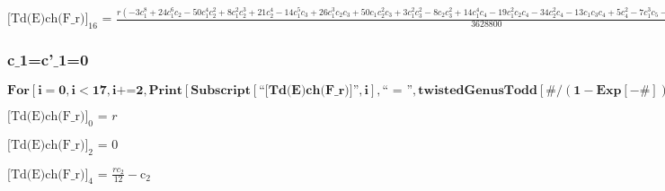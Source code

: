 \documentclass{article}
\newcommand{\unicode}[1]{{}}
\begin{document}
\noindent\(\text{[Td(E)ch(F$\_$r)]}_{16}\text{ = }\frac{r \left(-3 c_1^8+24 c_1^6 c_2-50 c_1^4 c_2^2+8 c_1^2 c_2^3+21 c_2^4-14 c_1^5 c_3+26 c_1^3
c_2 c_3+50 c_1 c_2^2 c_3+3 c_1^2 c_3^2-8 c_2 c_3^2+14 c_1^4 c_4-19 c_1^2 c_2 c_4-34 c_2^2 c_4-13 c_1 c_3 c_4+5 c_4^2-7 c_1^3 c_5-16 c_1 c_2 c_5+3
c_3 c_5+7 c_1^2 c_6+13 c_2 c_6+3 c_1 c_7-3 c_8\right)}{3628800}-\frac{\left(2 c_1^6-12 c_1^4 c_2+11 c_1^2 c_2^2+10 c_2^3+5 c_1^3 c_3+11 c_1 c_2 c_3-c_3^2-5
c_1^2 c_4-9 c_2 c_4-2 c_1 c_5+2 c_6\right) \text{c$\unicode{02bc}$}_2}{60480}+\frac{\left(-c_1^3 c_2+3 c_1 c_2^2+c_1^2 c_3-c_1 c_4\right) \text{c$\unicode{02bc}$}_3}{2880}+\frac{\left(-c_1^4+4
c_1^2 c_2+3 c_2^2+c_1 c_3-c_4\right) \left(2 \text{c$\unicode{02bc}$}_2^2-4 \text{c$\unicode{02bc}$}_4\right)}{17280}+\frac{c_1 c_2 \left(-5 \text{c$\unicode{02bc}$}_2
\text{c$\unicode{02bc}$}_3+5 \text{c$\unicode{02bc}$}_5\right)}{2880}+\frac{\left(c_1^2+c_2\right) \left(-2 \text{c$\unicode{02bc}$}_2^3+3 \text{c$\unicode{02bc}$}_3^2+6
\text{c$\unicode{02bc}$}_2 \text{c$\unicode{02bc}$}_4-6 \text{c$\unicode{02bc}$}_6\right)}{8640}+\frac{c_1 \left(7 \text{c$\unicode{02bc}$}_2^2 \text{c$\unicode{02bc}$}_3-7
\text{c$\unicode{02bc}$}_3 \text{c$\unicode{02bc}$}_4-7 \text{c$\unicode{02bc}$}_2 \text{c$\unicode{02bc}$}_5+7 \text{c$\unicode{02bc}$}_7\right)}{10080}+\frac{2
\text{c$\unicode{02bc}$}_2^4-8 \text{c$\unicode{02bc}$}_2 \text{c$\unicode{02bc}$}_3^2-8 \text{c$\unicode{02bc}$}_2^2 \text{c$\unicode{02bc}$}_4+4
\text{c$\unicode{02bc}$}_4^2+8 \text{c$\unicode{02bc}$}_3 \text{c$\unicode{02bc}$}_5+8 \text{c$\unicode{02bc}$}_2 \text{c$\unicode{02bc}$}_6-8 \text{c$\unicode{02bc}$}_8}{40320}\)

\subsubsection*{c$\_$1=c{'}$\_$1=0}

\begin{doublespace}
\noindent\(\pmb{\text{For}\left[i=0,i<17,i\text{+=}2, \text{Print}\left[\text{Subscript}[\text{{``}[Td(E)ch(F$\_$r)]{''}},i],\text{{``} = {''}},\text{twistedGenusTodd}[\#/(1-\text{Exp}[-\#])\&,i]
\text{/.}c_1\to 0\text{/.}\text{c$\unicode{02bc}$}_1\to 0\right]\right]}\)
\end{doublespace}

\noindent\(\text{[Td(E)ch(F$\_$r)]}_0\text{ = }r\)

\noindent\(\text{[Td(E)ch(F$\_$r)]}_2\text{ = }0\)

\noindent\(\text{[Td(E)ch(F$\_$r)]}_4\text{ = }\frac{r c_2}{12}-\text{c$\unicode{02bc}$}_2\)
\end{document}
